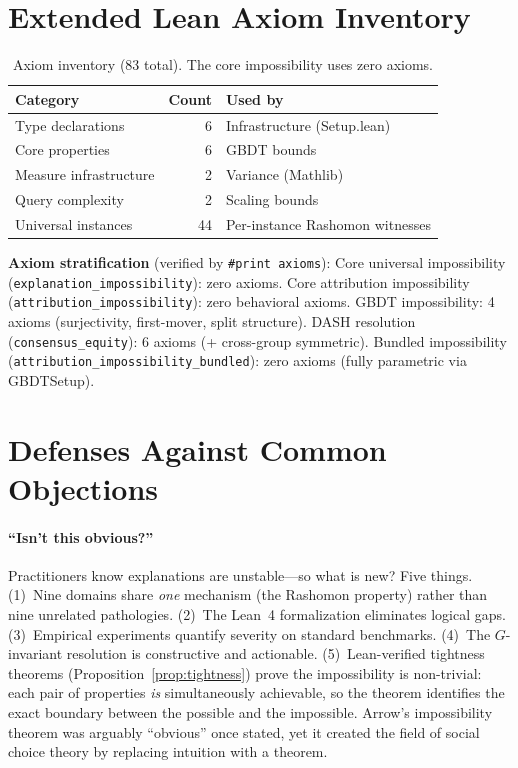 \documentclass{article}
\begin{document}
\section{Extended Lean Axiom Inventory}
\label{app:lean}

\begin{table}[h]
\centering
\caption{Axiom inventory (83 total). The core impossibility uses zero axioms.}
\label{tab:axioms}
\small
\begin{tabular}{lrl}
\toprule
Category & Count & Used by \\
\midrule
Type declarations & 6 & Infrastructure (Setup.lean) \\
Core properties & 6 & GBDT bounds \\
Measure infrastructure & 2 & Variance (Mathlib) \\
Query complexity & 2 & Scaling bounds \\
Universal instances & 44 & Per-instance Rashomon witnesses \\
\bottomrule
\end{tabular}
\end{table}

\textbf{Axiom stratification} (verified by \texttt{\#print axioms}):
Core universal impossibility (\texttt{explanation\_impossibility}): zero axioms.
Core attribution impossibility (\texttt{attribution\_impossibility}): zero behavioral axioms.
GBDT impossibility: 4 axioms (surjectivity, first-mover, split structure).
DASH resolution (\texttt{consensus\_equity}): 6 axioms (+ cross-group symmetric).
Bundled impossibility (\texttt{attribution\_impossibility\_bundled}): zero axioms (fully parametric via GBDTSetup).

\section{Defenses Against Common Objections}
\label{app:defenses}

\paragraph{``Isn't this obvious?''}
Practitioners know explanations are unstable---so what is new?  Five things.
(1)~Nine domains share \emph{one} mechanism (the Rashomon property) rather than nine unrelated pathologies.
(2)~The Lean~4 formalization eliminates logical gaps.
(3)~Empirical experiments quantify severity on standard benchmarks.
(4)~The $G$-invariant resolution is constructive and actionable.
(5)~Lean-verified tightness theorems (Proposition~\ref{prop:tightness}) prove the impossibility is non-trivial: each pair of properties \emph{is} simultaneously achievable, so the theorem identifies the exact boundary between the possible and the impossible.
Arrow's impossibility theorem was arguably ``obvious'' once stated, yet it created the field of social choice theory by replacing intuition with a theorem.
\end{document}
